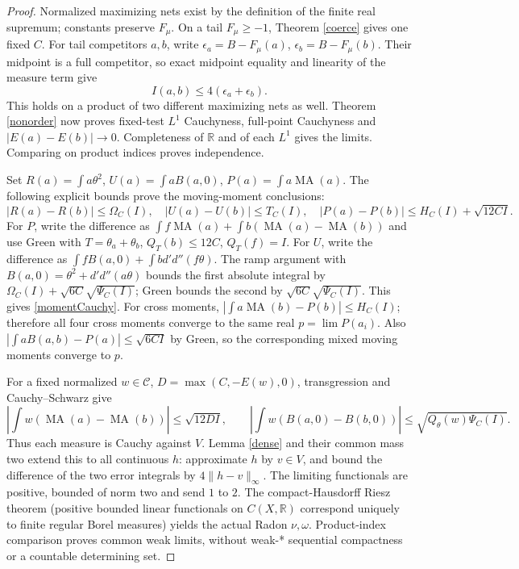 \documentclass[11pt]{article}
\newcommand{\DD}{d'd''}
\newcommand{\MA}{\operatorname{MA}}
\newcommand{\C}{\mathcal C}
\newcommand{\R}{\mathbb R}
\begin{document}
\begin{proof}
Normalized maximizing nets exist by the definition of the finite real
supremum; constants preserve $F_\mu$. On a tail $F_\mu\ge-1$,
Theorem \ref{coerce} gives one fixed $C$. For tail competitors $a,b$,
write $\epsilon_a=B-F_\mu(a)$, $\epsilon_b=B-F_\mu(b)$.
Their midpoint is a full competitor, so exact midpoint equality and
linearity of the measure term give
\begin{equation}\label{deficit}
 I(a,b)\le4(\epsilon_a+\epsilon_b).
\end{equation}
This holds on a product of two different maximizing nets as well.
Theorem \ref{nonorder} now proves fixed-test $L^1$ Cauchyness, full-point
Cauchyness and $|E(a)-E(b)|\to0$. Completeness of $\R$ and of each
$L^1$ gives the limits. Comparing on product indices proves independence.

Set $R(a)=\int a\theta^2$, $U(a)=\int aB(a,0)$,
$P(a)=\int a\MA(a)$. The following explicit bounds prove the
moving-moment conclusions:
\begin{equation}\label{momentCauchy}
 |R(a)-R(b)|\le\Omega_C(I),\quad
 |U(a)-U(b)|\le T_C(I),\quad
 |P(a)-P(b)|\le H_C(I)+\sqrt{12CI}.
\end{equation}
For $P$, write the difference as
$\int f\MA(a)+\int b(\MA(a)-\MA(b))$ and use Green with
$T=\theta_a+\theta_b$, $Q_T(b)\le12C$, $Q_T(f)=I$.
For $U$, write the difference as
$\int fB(a,0)+\int b\DD(f\theta)$.
The ramp argument with $B(a,0)=\theta^2+\DD(a\theta)$ bounds
the first absolute integral by
$\Omega_C(I)+\sqrt{6C}\sqrt{\Psi_C(I)}$; Green bounds the
second by $\sqrt{6C}\sqrt{\Psi_C(I)}$. This gives \eqref{momentCauchy}.
For cross moments, $|\int a\MA(b)-P(b)|\le H_C(I)$;
therefore all four cross moments converge to the same real $p=\lim P(a_i)$.
Also $|\int aB(a,b)-P(a)|\le\sqrt{6CI}$ by Green, so the
corresponding mixed moving moments converge to $p$.

For a fixed normalized $w\in\C$, $D=\max(C,-E(w),0)$,
transgression and Cauchy--Schwarz give
\begin{equation}\label{weaktests}
 |\int w(\MA(a)-\MA(b))|\le\sqrt{12D I},\qquad
 |\int w(B(a,0)-B(b,0))|\le\sqrt{Q_\theta(w)\Psi_C(I)}.
\end{equation}
Thus each measure is Cauchy against $V$. Lemma \ref{dense} and their
common mass two extend this to all continuous $h$: approximate $h$ by
$v\in V$, and bound the difference of the two error integrals by
$4\|h-v\|_\infty$. The limiting functionals are positive, bounded
of norm two and send $1$ to $2$. The compact-Hausdorff Riesz theorem
(positive bounded linear functionals on $C(X,\R)$ correspond uniquely
to finite regular Borel measures) yields the actual Radon $\nu,\omega$.
Product-index comparison proves common weak limits, without weak-* sequential
compactness or a countable determining set.
\end{proof}
\end{document}
